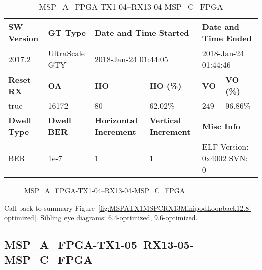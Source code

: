 \begin{table}[h]
\centering
\caption{MSP\_A\_FPGA-TX1-04--RX13-04-MSP\_C\_FPGA}
\label{tab:MSPAFPGATX104RX1304MSPCFPGA12.8-optimized}
\begin{tabular}{@{}|l|l|l|l|l|l|@{}}
\toprule
\textbf{SW Version}                & \textbf{GT Type}   & \multicolumn{2}{l|}{\textbf{Date and Time Started}}            & \multicolumn{2}{l|}{\textbf{Date and Time Ended}}        \\ \midrule
2017.2                       & UltraScale GTY          & \multicolumn{2}{l|}{2018-Jan-24 01:44:05}                   & \multicolumn{2}{l|}{2018-Jan-24 01:44:46}               \\ \midrule
\textbf{Reset RX}                  & \textbf{OA} & \textbf{HO}   & \textbf{HO (\%)} & \textbf{VO} & \textbf{VO (\%)} \\ \midrule
true & 16172        & 80          & 62.02\%        & 249        & 96.86\%       \\ \midrule
\textbf{Dwell Type}                & \textbf{Dwell BER} & \textbf{Horizontal Increment} & \textbf{Vertical Increment}    & \multicolumn{2}{l|}{\textbf{Misc Info}}                  \\ \midrule
BER                            & 1e-7        & 1        & 1           & \multicolumn{2}{l|}{ELF Version: 0x4002 SVN: 0}                         \\ \bottomrule
\end{tabular}
\end{table}

\begin{figure}[h]
\caption{MSP\_A\_FPGA-TX1-04--RX13-04-MSP\_C\_FPGA} \label{fig:MSPAFPGATX104RX1304MSPCFPGA12.8-optimized}
\end{figure}

Call back to summary Figure~\ref{fig:MSPATX1MSPCRX13MinipodLoopback12.8-optimized}.
Sibling eye diagrams: \hyperref[sec:MSPAFPGATX104RX1304MSPCFPGA6.4-optimized]{6.4-optimized}, \hyperref[sec:MSPAFPGATX104RX1304MSPCFPGA9.6-optimized]{9.6-optimized}.

\clearpage
\newpage


\subsection{MSP\_A\_FPGA-TX1-05--RX13-05-MSP\_C\_FPGA}\label{sec:MSPAFPGATX105RX1305MSPCFPGA12.8-optimized}

